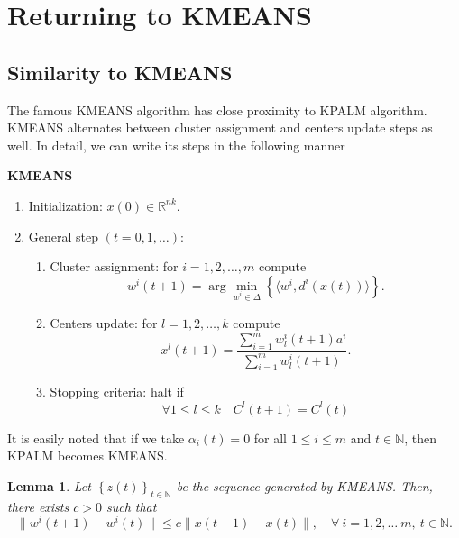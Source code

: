 \documentclass[11pt]{article}
\numberwithin{equation}{section}
\newtheorem{lemma}{Lemma}[proposition]
\begin{document}
\newpage


\section{Returning to KMEANS}
\subsection{Similarity to KMEANS}
The famous KMEANS algorithm has close proximity to KPALM algorithm. KMEANS alternates between cluster assignment and centers update steps as well. In detail, we can write its steps in the following manner

\begin{framed}
\noindent \textbf{KMEANS}
\begin{enumerate}[(1)]
	\item Initialization: $x(0) \in \mathbb{R}^{nk}$.
	\item General step $\left( t=0,1, \ldots \right)$:
	\begin{enumerate}[(2.1)]
		\item Cluster assignment: for $i=1, 2, \ldots ,m$ compute
		\begin{equation}
			w^i(t+1) = \arg\!\min\limits_{w^i \in \Delta} \left\lbrace \langle w^i , d^i(x(t)) \rangle\right\rbrace . \label{StateEq12}
		\end{equation}
		\item Centers update: for $l=1, 2, \ldots ,k$ compute
		\begin{equation}
			x^l(t+1) = \frac{\sum_{i=1}^{m} w^i_l(t+1) a^i}{\sum_{i=1}^{m} w^i_l(t+1)} . \label{StateEq13}
		\end{equation}
		\item Stopping criteria: halt if 
		\begin{equation}
			\forall 1 \leq l \leq k \quad C^l(t+1)=C^l(t) \label{StateEq15}
		\end{equation}
	\end{enumerate}
\end{enumerate}
\end{framed}

It is easily noted that if we take $\alpha_i(t) = 0$ for all $1 \leq i \leq m$ and $t \in \mathbb{N}$, then KPALM becomes KMEANS.

\begin{lemma} \label{StateLemma_x_bounds_w}
Let $\left\lbrace z(t) \right\rbrace_{t \in \mathbb{N}}$ be the sequence generated by KMEANS. Then, there exists $c > 0$ such that
\begin{equation*}
	\|w^i(t+1)-w^i(t)\| \leq c \|x(t+1)-x(t)\| , \quad \forall \: i=1,2, \ldots\ m, \: t \in \mathbb{N} .
\end{equation*}
\end{lemma}
\end{document}
